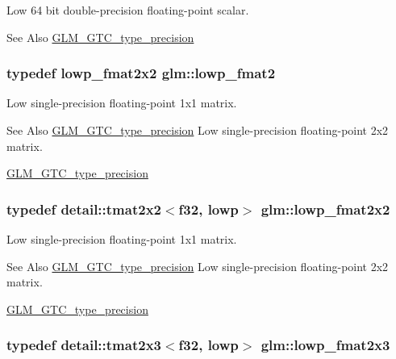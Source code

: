 Low 64 bit double-\/precision floating-\/point scalar. \begin{DoxySeeAlso}{See Also}
\hyperlink{group__gtc__type__precision}{G\-L\-M\-\_\-\-G\-T\-C\-\_\-type\-\_\-precision} 
\end{DoxySeeAlso}
\hypertarget{group__gtc__type__precision_ga9bafb192cb7327d543ad55be2e6e675c}{
\subsubsection[{lowp\-\_\-fmat2}]{\setlength{\rightskip}{0pt plus 5cm}typedef lowp\-\_\-fmat2x2 {\bf glm\-::lowp\-\_\-fmat2}}}\label{group__gtc__type__precision_ga9bafb192cb7327d543ad55be2e6e675c}
Low single-\/precision floating-\/point 1x1 matrix. \begin{DoxySeeAlso}{See Also}
\hyperlink{group__gtc__type__precision}{G\-L\-M\-\_\-\-G\-T\-C\-\_\-type\-\_\-precision} Low single-\/precision floating-\/point 2x2 matrix. 

\hyperlink{group__gtc__type__precision}{G\-L\-M\-\_\-\-G\-T\-C\-\_\-type\-\_\-precision} 
\end{DoxySeeAlso}
\hypertarget{group__gtc__type__precision_ga99367a30c64035d7e7f76410105d10e3}{
\subsubsection[{lowp\-\_\-fmat2x2}]{\setlength{\rightskip}{0pt plus 5cm}typedef detail\-::tmat2x2$<$f32, lowp$>$ {\bf glm\-::lowp\-\_\-fmat2x2}}}\label{group__gtc__type__precision_ga99367a30c64035d7e7f76410105d10e3}
Low single-\/precision floating-\/point 1x1 matrix. \begin{DoxySeeAlso}{See Also}
\hyperlink{group__gtc__type__precision}{G\-L\-M\-\_\-\-G\-T\-C\-\_\-type\-\_\-precision} Low single-\/precision floating-\/point 2x2 matrix. 

\hyperlink{group__gtc__type__precision}{G\-L\-M\-\_\-\-G\-T\-C\-\_\-type\-\_\-precision} 
\end{DoxySeeAlso}
\hypertarget{group__gtc__type__precision_ga01c5c29a6cee22c3e75de25c98dbecc9}{
\subsubsection[{lowp\-\_\-fmat2x3}]{\setlength{\rightskip}{0pt plus 5cm}typedef detail\-::tmat2x3$<$f32, lowp$>$ {\bf glm\-::lowp\-\_\-fmat2x3}}}\label{group__gtc__type__precision_ga01c5c29a6cee22c3e75de25c98dbecc9}
